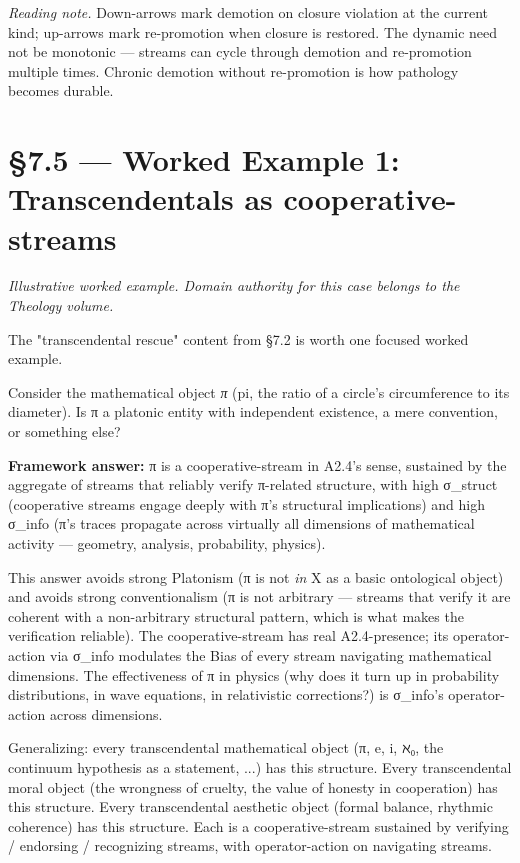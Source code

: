 \documentclass[11pt, openany]{book}
\newcommand{\sectionbreak}{\clearpage}
\begin{document}
\textit{Reading note.} Down-arrows mark demotion on closure violation at the current kind; up-arrows mark re-promotion when closure is restored. The dynamic need not be monotonic --- streams can cycle through demotion and re-promotion multiple times. Chronic demotion without re-promotion is how pathology becomes durable.

\sectionbreak

\section{§7.5 --- Worked Example 1: Transcendentals as cooperative-streams}

\textit{Illustrative worked example. Domain authority for this case belongs to the Theology volume.}

The "transcendental rescue" content from §7.2 is worth one focused worked example.

Consider the mathematical object \textit{π} (pi, the ratio of a circle's circumference to its diameter). Is π a platonic entity with independent existence, a mere convention, or something else?

\textbf{Framework answer:} π is a cooperative-stream in A2.4's sense, sustained by the aggregate of streams that reliably verify π-related structure, with high σ\_\allowbreak{}struct (cooperative streams engage deeply with π's structural implications) and high σ\_\allowbreak{}info (π's traces propagate across virtually all dimensions of mathematical activity --- geometry, analysis, probability, physics).

This answer avoids strong Platonism (π is not \textit{in} X as a basic ontological object) and avoids strong conventionalism (π is not arbitrary --- streams that verify it are coherent with a non-arbitrary structural pattern, which is what makes the verification reliable). The cooperative-stream has real A2.4-presence; its operator-action via σ\_\allowbreak{}info modulates the Bias of every stream navigating mathematical dimensions. The effectiveness of π in physics (why does it turn up in probability distributions, in wave equations, in relativistic corrections?) is σ\_\allowbreak{}info's operator-action across dimensions.

Generalizing: every transcendental mathematical object (π, e, i, ℵ₀, the continuum hypothesis as a statement, ...) has this structure. Every transcendental moral object (the wrongness of cruelty, the value of honesty in cooperation) has this structure. Every transcendental aesthetic object (formal balance, rhythmic coherence) has this structure. Each is a cooperative-stream sustained by verifying / endorsing / recognizing streams, with operator-action on navigating streams.
\end{document}
